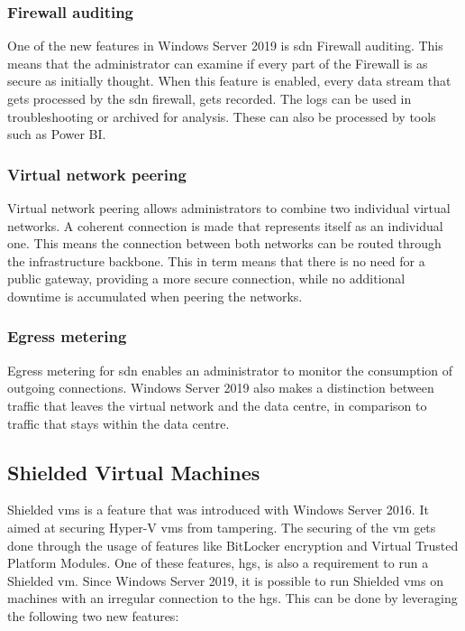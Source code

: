 \subsubsection{Firewall auditing}
One of the new features in Windows Server 2019 is \acrshort{sdn} Firewall auditing. 
This means that the administrator can examine if every part of the Firewall is as secure as initially thought. 
When this feature is enabled, every data stream that gets processed by the \acrshort{sdn} firewall, gets recorded. 
The logs can be used in troubleshooting or archived for analysis. 
These can also be processed by tools such as Power BI.

\subsubsection{Virtual network peering}
Virtual network peering allows administrators to combine two individual virtual networks. 
A coherent connection is made that represents itself as an individual one. 
This means the connection between both networks can be routed through the infrastructure backbone. 
This in term means that there is no need for a public gateway, providing a more secure connection, while no additional downtime is accumulated when peering the networks.

\subsubsection{Egress metering}
Egress metering for \acrshort{sdn} enables an administrator to monitor the consumption of outgoing connections.
Windows Server 2019 also makes a distinction between traffic that leaves the virtual network and the data centre, in comparison to traffic that stays within the data centre. 

\subsection{Shielded Virtual Machines}
Shielded \acrshort{vm}s is a feature that was introduced with Windows Server 2016. It aimed at securing Hyper-V \acrshort{vm}s from tampering. The securing of the \acrshort{vm} gets done through the usage of features like BitLocker encryption and Virtual Trusted Platform Modules. 
One of these features, \acrfull{hgs}, is also a requirement to run a Shielded \acrshort{vm}. 
Since Windows Server 2019, it is possible to run Shielded \acrshort{vm}s on machines with an irregular connection to the \acrshort{hgs}. 
This can be done by leveraging the following two new features:

